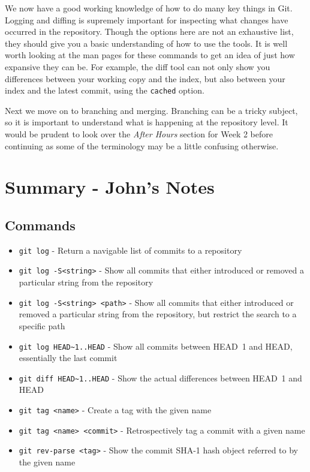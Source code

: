 We now have a good working knowledge of how to do many key things in Git.
Logging and diffing is supremely important for inspecting what changes have occurred in the repository.
Though the options here are not an exhaustive list, they should give you a basic understanding of how to use the tools.
It is well worth looking at the man pages for these commands to get an idea of just how expansive they can be.
For example, the diff tool can not only show you differences between your working copy and the index, but also between your index and the latest commit, using the \texttt{cached} option.

Next we move on to branching and merging.
Branching can be a tricky subject, so it is important to understand what is happening at the repository level.
It would be prudent to look over the \emph{After Hours} section for Week 2 before continuing as some of the terminology may be a little confusing otherwise.

\clearpage
\section{Summary - John's Notes}
\subsection{Commands}
\begin{itemize}
\item\texttt{git log} - Return a navigable list of commits to a repository
\item\texttt{git log -S<string>} - Show all commits that either introduced or removed a particular string from the repository
\item\texttt{git log -S<string> <path>} - Show all commits that either introduced or removed a particular string from the repository, but restrict the search to a specific path
\item\texttt{git log HEAD\textasciitilde1..HEAD} - Show all commits between HEAD~1 and HEAD, essentially the last commit
\item\texttt{git diff HEAD\textasciitilde1..HEAD} - Show the actual differences between HEAD~1 and HEAD
\item\texttt{git tag <name>} - Create a tag with the given name
\item\texttt{git tag <name> <commit>} - Retrospectively tag a commit with a given name
\item\texttt{git rev-parse <tag>} - Show the commit SHA-1 hash object referred to by the given name
\end{itemize}

